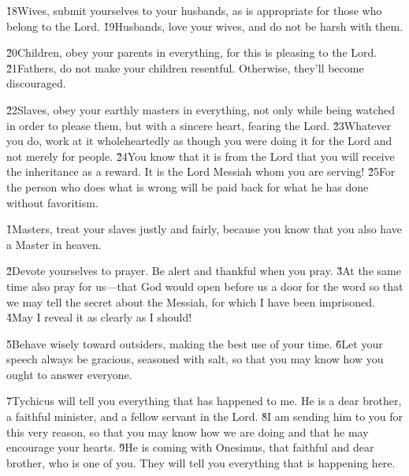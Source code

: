 \v{18}Wives, submit yourselves to your husbands, as is appropriate for those who belong to the Lord. \v{19}Husbands, love your wives, and do not be harsh with them.

\v{20}Children, obey your parents in everything, for this is pleasing to the Lord. \v{21}Fathers, do not make your children resentful. Otherwise, they'll become discouraged.

\v{22}Slaves, obey your earthly masters in everything, not only while being watched in order to please them, but with a sincere heart, fearing the Lord. \v{23}Whatever you do, work at it wholeheartedly as though you were doing it for the Lord and not merely for people. \v{24}You know that it is from the Lord that you will receive the inheritance as a reward. It is the Lord Messiah whom you are serving! \v{25}For the person who does what is wrong will be paid back for what he has done without favoritism.

\v{1}Masters, treat your slaves justly and fairly, because you know that you also have a Master in heaven.

\v{2}Devote yourselves to prayer. Be alert and thankful when you pray. \v{3}At the same time also pray for us---that God would open before us a door for the word so that we may tell the secret about the Messiah, for which I have been imprisoned. \v{4}May I reveal it as clearly as I should!

\v{5}Behave wisely toward outsiders, making the best use of your time. \v{6}Let your speech always be gracious, seasoned with salt, so that you may know how you ought to answer everyone.

\v{7}Tychicus will tell you everything that has happened to me. He is a dear brother, a faithful minister, and a fellow servant in the Lord. \v{8}I am sending him to you for this very reason, so that you may know how we are doing and that he may encourage your hearts. \v{9}He is coming with Onesimus, that faithful and dear brother, who is one of you. They will tell you everything that is happening here.

